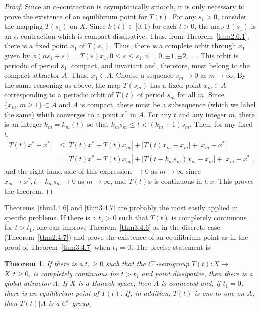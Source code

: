 \documentclass{surv-l}
\theoremstyle{plain}
\newtheorem{theorem}{Theorem}[section]
\theoremstyle{definition}
\numberwithin{equation}{section}
\numberwithin{figure}{chapter}
\begin{document}
\begin{proof} Since an $\alpha$-contraction is asymptotically smooth, it is only necessary to prove the existence of an equilibrium point for $T(t)$. For any $s_{1}>0$, consider the mapping $T(s_{1})$ on $X$. Since $k(t)\in[0,1)$ for each $t>0$, the map $T(s_{1})$ is an $\alpha$-contraction which is compact dissipative. Thus, from Theorem~\ref{thm2.6.1}, there is a fixed point $x_{1}$ of $T(s_{1})$. Thus, there is a complete orbit through $x_{1}$ given by $\phi(ns_{1}+s)=T(s)x_{1},0\leq s\leq s_{1},n=0,\pm 1,\pm 2,\ldots\, $. This orbit is periodic of period $s_{1}$, compact, and invariant and, therefore, must belong to the compact attractor $A$. Thus, $x_{1}\in A$. Choose a sequence $s_{m}\rightarrow 0$ as $ m\rightarrow\infty$. By the same reasoning as above, the map $T(s_{m})$ has a fixed point $x_{m}\in A$ corresponding to a periodic orbit of $T(t)$ of period $s_{m}$ for all $m$. Since $\{x_{m}, m\geq 1\}\subset A$ and $A$ is compact, there must be a subsequence (which we label the same) which converges to a point $x^{\ast}$ in $A$. For any $t$ and any integer $m$, there is an integer $k_{m}=k_{m}(t)$ so that $k_{m}s_{m}\leq t<(k_{m}+1)s_{m}$. Then, for any fixed $t$,
\begin{align*}
|T(t)x^{\ast}-x^{\ast}|&\leq|T(t)x^{\ast}-T(t)x_{m}|+|T(t)x_{m}-x_{m}|+|x_{m}-x^{\ast}|\\
&=|T(t)x^{\ast}-T(t)x_{m}|+|T(t-k_{m}s_{m})x_{m}-x_{m}|+|x_{m}-x^{\ast}|,
\end{align*}
and the right hand side of this expression $\rightarrow 0$ as $ m\rightarrow\infty$ since $x_{m}\rightarrow x^{\ast},t-k_{m}s_{m}\rightarrow 0$ as $ m\rightarrow\infty$, and $T(t)x$ is continuous in $t,x$. This proves the theorem.
\end{proof}

Theorems~\ref{thm3.4.6} and \ref{thm3.4.7} are probably the most easily applied in specific problems. If there is a $t_{1}>0$ such that $T(t)$ is completely continuous for $t>t_{1}$, one can improve Theorem~\ref{thm3.4.6} as in the discrete case (Theorem~\ref{thm2.4.7}) and prove the existence of an equilibrium point as in the proof of Theorem~\ref{thm3.4.7} when $t_{1}=0$. The precise statement is

\begin{theorem}\label{thm3.4.8} If there is a $t_{1}\geq 0$ such that the $C^{r}$-semigroup $ T(t)\!:X\rightarrow$
$X,t\geq 0$, is completely continuous for $t>t_{1}$ and point dissipative, then there is a global attractor A. If $X$ is a Banach space, then $A$ is connected and, if $t_{1}=0$, there is an equilibrium point of $T(t)$. If, in addition, $T(t)$ is one-to-one on $A$, then $T(t)|A$ is a $C^{r}$-group.
\end{theorem}
\end{document}
